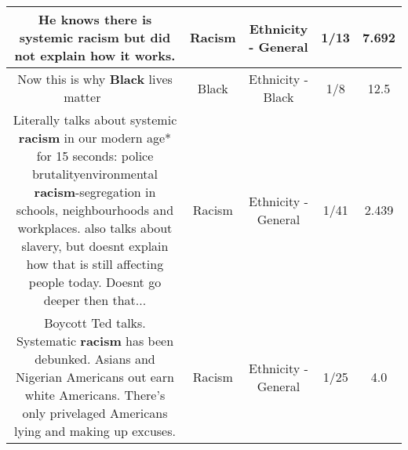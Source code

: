 \documentclass[11pt]{article}
\newlength\mylength
\begin{document}
\begin{center}
\begin{longtable}{|C{.65\mylength}|C{.30\mylength}|C{.12\mylength}|C{.12\mylength}|C{.12\mylength}|}
  \small He knows there is systemic \textbf{racism} but did not explain how it works.\normalsize   & Racism & Ethnicity - General & 1/13 & 7.692 \\  \hline
  \small Now this is why \textbf{Black} lives matter ✊🏾✊🏾✊🏾\normalsize   & Black & Ethnicity - Black & 1/8 & 12.5 \\  \hline
  \small Literally talks about systemic \textbf{racism} in our modern age* for 15 seconds: police brutalityenvironmental \textbf{racism}-segregation in schools, neighbourhoods and workplaces. also talks about slavery, but doesnt explain how that is still affecting people today. Doesnt go deeper then that...\normalsize   & Racism & Ethnicity - General & 1/41 & 2.439 \\  \hline
  \small Boycott Ted talks. Systematic \textbf{racism} has been debunked. Asians and  Nigerian Americans out earn white Americans. There's only privelaged Americans lying and making up excuses.\normalsize   & Racism & Ethnicity - General & 1/25 & 4.0 \\  \hline

\end{longtable}
\end{center}
\end{document}
